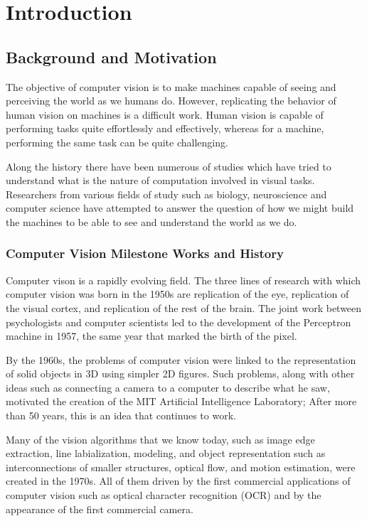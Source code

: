 \chapter{Introduction}

\section{Background and Motivation}
The objective of computer vision is to make machines capable of seeing and perceiving the world as we humans do. However, replicating the behavior of human vision on machines is a difficult work. Human vision is capable of performing tasks quite effortlessly and effectively, whereas for a machine, performing the same task can be quite challenging.

Along the history there have been numerous of studies which have tried to understand what is the nature of computation involved in visual tasks. Researchers from various fields of study such as biology, neuroscience and computer science have attempted to answer the question of how we might build the machines to be able to see and understand the world as we do.


\subsection{Computer Vision Milestone Works and History}
Computer vison is a rapidly evolving field. The three lines of research with which computer vision was born in the 1950s are replication of the eye, replication of the visual cortex, and replication of the rest of the brain. The joint work between psychologists and computer scientists led to the development of the Perceptron machine in 1957, the same year that marked the birth of the pixel.

By the 1960s, the problems of computer vision were linked to the representation of solid objects in 3D using simpler 2D figures. Such problems, along with other ideas such as connecting a camera to a computer to describe what he saw, motivated the creation of the MIT Artificial Intelligence Laboratory; After more than 50 years, this is an idea that continues to work.

Many of the vision algorithms that we know today, such as image edge extraction, line labialization, modeling, and object representation such as interconnections of smaller structures, optical flow, and motion estimation, were created in the 1970s. All of them driven by the first commercial applications of computer vision such as optical character recognition (OCR) and by the appearance of the first commercial camera.

